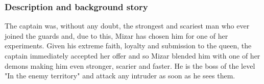 \subsubsection{Description and background story}
The captain was, without any doubt, the strongest and scariest man who ever joined the guards and, due to this, Mizar has chosen him for one of her experiments. Given his extreme faith, loyalty and submission to the queen, the captain immediately accepted her offer and so Mizar blended him with one of her demons making him even stronger, scarier and faster. He is the boss of the level "In the enemy territory" and attack any intruder as soon as he sees them.



